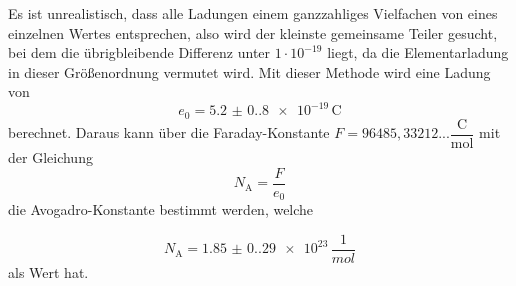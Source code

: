 Es ist unrealistisch, dass alle Ladungen einem ganzzahliges Vielfachen von eines einzelnen Wertes entsprechen, also wird der kleinste gemeinsame Teiler gesucht, bei dem die übrigbleibende Differenz unter $1 \cdot 10^{-19}$ liegt, da die Elementarladung in dieser Größenordnung vermutet wird.
Mit dieser Methode wird eine Ladung von 
\begin{equation}
  e_0 = \qty{5.2(0.8)e-19} \,\unit{\coulomb}
  \label{eq:egemessen}
\end{equation}
berechnet.
Daraus kann über die Faraday-Konstante $ F = 96485,33212... \dfrac{\unit{\coulomb}}{\text{mol}}$ \cite{go02} mit der Gleichung 
\begin{equation*}
  N_\text{A} = \dfrac{F}{e_0}
\end{equation*}
die Avogadro-Konstante bestimmt werden, welche 

\begin{equation*}
  N_\text{A} = \qty{1.85(0.29)e23} \, \dfrac{1}{\si{mol}}
\end{equation*}
als Wert hat.